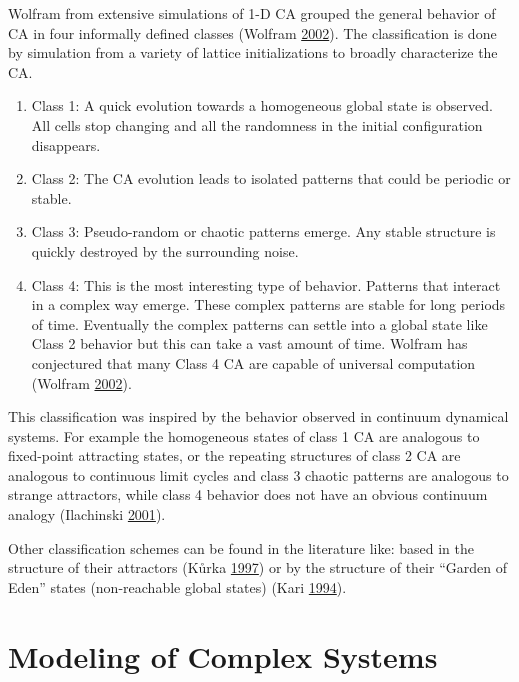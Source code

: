 \documentclass[
]{book}
\begin{document}
Wolfram from extensive simulations of 1-D CA grouped the general behavior of CA in four informally defined classes (Wolfram \protect\hyperlink{ref-wolfram2002new}{2002}). The classification is done by simulation from a variety of lattice initializations to broadly characterize the CA.

\begin{enumerate}
\def\labelenumi{\arabic{enumi}.}
\item
  Class 1: A quick evolution towards a homogeneous global state is observed. All cells stop changing and all the randomness in the initial configuration disappears.
\item
  Class 2: The CA evolution leads to isolated patterns that could be periodic or stable.
\item
  Class 3: Pseudo-random or chaotic patterns emerge. Any stable structure is quickly destroyed by the surrounding noise.
\item
  Class 4: This is the most interesting type of behavior. Patterns that interact in a complex way emerge. These complex patterns are stable for long periods of time. Eventually the complex patterns can settle into a global state like Class 2 behavior but this can take a vast amount of time. Wolfram has conjectured that many Class 4
  CA are capable of universal computation (Wolfram \protect\hyperlink{ref-wolfram2002new}{2002}).
\end{enumerate}

This classification was inspired by the behavior observed in continuum dynamical systems. For example the homogeneous states of class 1 CA are analogous to fixed-point attracting states, or the repeating structures of class 2 CA are analogous to continuous limit cycles and class 3 chaotic patterns are analogous to strange attractors, while class 4 behavior does not have an obvious continuum analogy (Ilachinski \protect\hyperlink{ref-ilachinski2001cellular}{2001}).

Other classification schemes can be found in the literature like: based in the structure of their attractors (Kůrka \protect\hyperlink{ref-kuurka1997languages}{1997}) or by the structure of their ``Garden of Eden'' states (non-reachable global states) (Kari \protect\hyperlink{ref-kari1994reversibility}{1994}).

\hypertarget{modeling-of-complex-systems}{%
\section{Modeling of Complex Systems}\label{modeling-of-complex-systems}}
\end{document}
